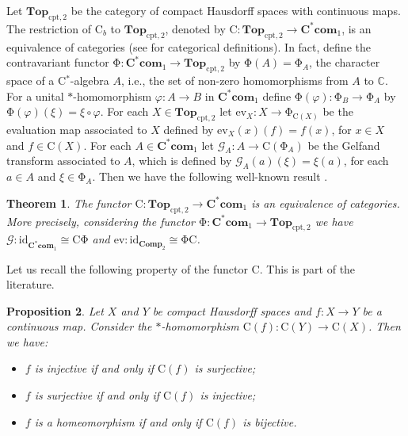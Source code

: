 \documentclass[manuscript]{amsart}
\newtheorem{theorem}{Theorem}[section]
\newtheorem{proposition}[theorem]{Proposition}
\theoremstyle{definition}
\begin{document}
Let
$\mathbf{Top}_{\mathrm{cpt,2}}$ be the category of compact Hausdorff spaces with continuous maps.
The restriction of $\mathrm{C}_{b}$ to $\mathbf{Top}_{\mathrm{cpt,2}}$, denoted by
$\mathrm{C}:\mathbf{Top}_{\mathrm{cpt,2}}\to \mathbf{C^{*}com}_{1}$, is an equivalence
of categories (see \cite{ma98} for categorical definitions). In fact,
define the contravariant functor
$\mathrm{\Phi}:\mathbf{C^{*}com}_{1} \to \mathbf{Top}_{\mathrm{cpt,2}}$ by
$\mathrm{\Phi}(A)=\mathrm{\Phi}_{A}$, the character  space of a C$^{*}$-algebra $A$,
i.e., the set of non-zero homomorphisms from $A$ to ${\mathbb{C}}$.
For
a unital $*$-homomorphism $\varphi :A\to B$ in $\mathbf{C^{*}com}_{1}$ define
$\mathrm{\Phi}(\varphi): \mathrm{\Phi}_{B}\to \mathrm{\Phi}_{A}$
by $\mathrm{\Phi}(\varphi)(\xi)=\xi\circ \varphi$.
For each $X\in \mathbf{Top}_{\mathrm{cpt,2}}$ let
$\mathrm{ev}_{X}:X\to \mathrm{\Phi}_{\mathrm{C}(X)}$ be the evaluation map associated to $X$
defined by $\mathrm{ev}_{X}(x)(f)=f(x)$, for  $x\in X$ and $f\in \mathrm{C}(X)$.
For
each $A\in \mathbf{C^{*}com}_{1}$ let $\mathcal{G}_{A}: A\to \mathrm{C}(\mathrm{\Phi}_{A})$
be the Gelfand transform associated to $A$, which is defined by
$\mathcal{G}_{A}(a)(\xi)=\xi(a)$, for each $a\in A$ and
$\xi\in \mathrm{\Phi}_{A}$.
Then we have the following well-known result \cite{mu90, ta79}.
\begin{theorem}\label{thrc}
The  functor $\mathrm{C}:\mathbf{Top}_{\mathrm{cpt,2}}\to \mathbf{C^{*}com}_{1}$ is an
equivalence of categories. More precisely, considering the  functor
$\mathrm{\Phi}:\mathbf{C^{*}com}_{1} \to \mathbf{Top}_{\mathrm{cpt,2}}$ we have
$\mathcal{G}:\mathrm{id}_{\mathbf{C^{*}com}_{1}}\cong
\mathrm{C}\mathrm{\Phi}$ and
$\mathrm{ev}: \mathrm{id}_{\mathbf{Comp}_{2}}\cong \mathrm{\Phi} \mathrm{C}$.
\end{theorem}
Let us recall the following property of the functor $\mathrm{C}$. This  is part of the literature.
\begin{proposition}\label{proccpt}
Let $X$ and $Y$ be compact Hausdorff spaces and $f:X\to Y$ be a continuous map.
Consider the $*$-homomorphism $\mathrm{C}(f): \mathrm{C}(Y)\to \mathrm{C}(X)$.
Then we have:
\begin{itemize}
\item[(1)]
$f$ is injective if and only if $\mathrm{C}(f)$ is surjective;
\item[(2)]
$f$ is surjective if and only if $\mathrm{C}(f)$ is injective;
\item[(3)]
$f$ is a homeomorphism if and only if $\mathrm{C}(f)$ is bijective.
\end{itemize}
\end{proposition}
\end{document}
